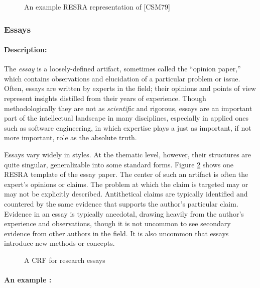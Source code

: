 \begin{figure}[htb]
  \caption{An example RESRA representation of [CSM79]}
  \label{fig:curtis}
\end{figure}


\subsubsection{Essays}

\paragraph{Description:}

The {\it essay} is a loosely-defined artifact, sometimes called the
``opinion paper,'' which contains observations and elucidation of a
particular problem or issue. Often, essays are written by experts in the
field; their opinions and points of view represent insights distilled from
their years of experience. Though methodologically they are not as
{\it scientific\/} and rigorous, essays are an important part of the
intellectual landscape in many disciplines, especially in applied ones such
as software engineering, in which expertise plays a just as important, if
not more important, role as the absolute truth.

Essays vary widely in styles. At the thematic level, however, their
structures are quite singular, generalizable into some standard forms.
Figure \ref{fig:expository} shows one RESRA template of the essay paper.
The center of such an artifact is often the expert's opinions or claims.
The problem at which the claim is targeted may or may not be explicitly
described. Antithetical claims are typically identified and countered by
the same evidence that supports the author's particular claim.  Evidence in
an essay is typically anecdotal, drawing heavily from the author's
experience and observations, though it is not uncommon to see secondary
evidence from other authors in the field.  It is also uncommon that essays
introduce new methods or concepts.

\begin{figure}[htb]
  \caption{A CRF for research essays}
  \label{fig:expository}
\end{figure}

\paragraph{An example :}

